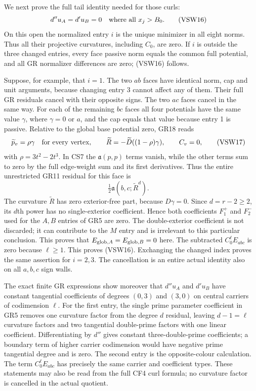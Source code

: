 We next prove the full tail identity needed for those curls:
\[
       d''u_A=d'u_B=0\quad\hbox{where all }x_j>B_0.
 \tag{VSW16}
\]
On this open the normalized entry $i$ is the unique minimizer
in all eight norms.  Thus all their projective curvatures,
including $C_0$, are zero.  If $i$ is outside the three changed
entries, every face passive norm equals the common full potential,
and all GR normalizer differences are zero; (VSW16) follows.

Suppose, for example, that $i=1$.  The two $ab$ faces have
identical norm, cap and unit arguments, because changing entry 3
cannot affect any of them.  Their full GR residuals cancel with
their opposite signs.  The two $ac$ faces cancel in the same
way.  For each of the remaining $bc$ faces all four potentials
have the same value $\gamma$, where $\gamma=0$ or $a$, and
the cap equals that value because entry 1 is passive.
Relative to the global base potential zero, GR18 reads
\[
 \widetilde p_v=\rho\gamma\quad\hbox{for every vertex},
 \qquad
 \widetilde R=-\widetilde D((1-\rho)\gamma),
 \qquad C_v=0,
 \tag{VSW17}
\]
with $\rho=3t^2-2t^3$.  In CS7 the $\mathfrak a(p,p)$
terms vanish, while the other terms sum to zero by the full
edge-weight sum and its first derivatives.  Thus the entire
unrestricted GR11 residual for this face is
\[
             \tfrac12\mathfrak a(b,c;\widetilde R^{d}).
 \tag{VSW18}
\]
The curvature $\widetilde R$ has zero exterior-free part,
because $D\gamma=0$.  Since $d=r-2\ge2$, its $d$th power
has no single-exterior coefficient.  Hence both coefficients
$F_1^+$ and $F_2^-$ used for the $A,B$ entries of GR5 are zero.
The double-exterior coefficient is not discarded; it can contribute
to the $M$ entry and is irrelevant to this particular conclusion.
This proves that $E_{{\rm glob},A}=E_{{\rm glob},B}=0$ here.
The subtracted $C_0^\ell E_{abc}$ is zero because $\ell\ge1$.
This proves (VSW16).  Exchanging the changed index proves the
same assertion for $i=2,3$.  The cancellation is an entire
actual identity also on all $a,b,c$ sign walls.

The exact finite GR expressions show moreover that $d''u_A$
and $d'u_B$ have constant tangential coefficients of degrees
$(0,3)$ and $(3,0)$ on central carriers of codimension $\ell$.
For the first entry, the single prime parameter coefficient in
GR5 removes one curvature factor from the degree $d$ residual,
leaving $d-1=\ell$ curvature factors and two tangential
double-prime factors with one linear coefficient.  Differentiating
by $d''$ gives constant three-double-prime coefficients; a boundary
term of higher carrier codimension would have negative prime
tangential degree and is zero.  The second entry is the
opposite-colour calculation.  The term $C_0^\ell E_{abc}$
has precisely the same carrier and coefficient types.
These statements may also be read from the full CF4 curl formula;
no curvature factor is cancelled in the actual quotient.

